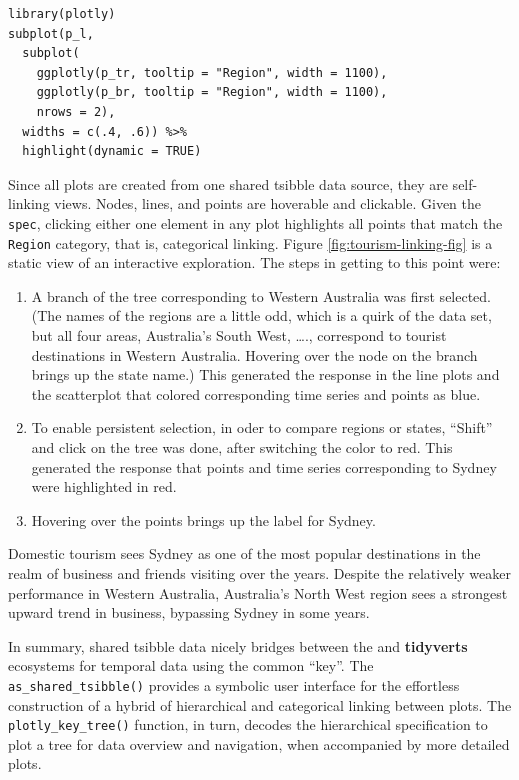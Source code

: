 \begin{verbatim}
library(plotly)
subplot(p_l,
  subplot(
    ggplotly(p_tr, tooltip = "Region", width = 1100),
    ggplotly(p_br, tooltip = "Region", width = 1100),
    nrows = 2),
  widths = c(.4, .6)) %>%
  highlight(dynamic = TRUE)
\end{verbatim}

Since all plots are created from one shared tsibble data source, they are self-linking views. Nodes, lines, and points are hoverable and clickable. Given the \texttt{spec}, clicking either one element in any plot highlights all points that match the \texttt{Region} category, that is, categorical linking. Figure \ref{fig:tourism-linking-fig} is a static view of an interactive exploration. The steps in getting to this point were:

\begin{enumerate}
\def\labelenumi{\arabic{enumi}.}
\tightlist
\item
  A branch of the tree corresponding to Western Australia was first selected. (The names of the regions are a little odd, which is a quirk of the data set, but all four areas, Australia's South West, \ldots., correspond to tourist destinations in Western Australia. Hovering over the node on the branch brings up the state name.) This generated the response in the line plots and the scatterplot that colored corresponding time series and points as blue.
\item
  To enable persistent selection, in oder to compare regions or states, ``Shift'' and click on the tree was done, after switching the color to red. This generated the response that points and time series corresponding to Sydney were highlighted in red.
\item
  Hovering over the points brings up the label for Sydney.
\end{enumerate}

Domestic tourism sees Sydney as one of the most popular destinations in the realm of business and friends visiting over the years. Despite the relatively weaker performance in Western Australia, Australia's North West region sees a strongest upward trend in business, bypassing Sydney in some years.

In summary, shared tsibble data nicely bridges between the  and \textbf{tidyverts} ecosystems for temporal data using the common ``key''. The \texttt{as\_shared\_tsibble()} provides a symbolic user interface for the effortless construction of a hybrid of hierarchical and categorical linking between plots. The \texttt{plotly\_key\_tree()} function, in turn, decodes the hierarchical specification to plot a tree for data overview and navigation, when accompanied by more detailed plots.

